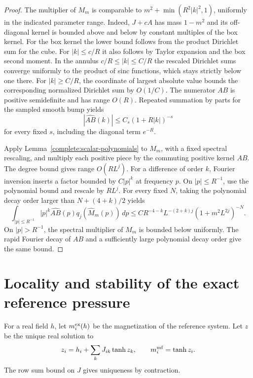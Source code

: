 \documentclass[11pt]{article}
\begin{document}
\begin{proof}
The multiplier of \(M_m\) is comparable to
\(m^2+\min(R^2|k|^2,1)\), uniformly in the indicated parameter range. Indeed, \(J+cA\) has mass \(1-m^2\) and its off-diagonal kernel is bounded above and below by constant multiples of the box kernel. For the box kernel the lower bound follows from the product Dirichlet sum for the cube. For \(|k|\le c/R\) it also follows by Taylor expansion and the box second moment. In the annulus \(c/R\le |k|\le C/R\) the rescaled Dirichlet sums converge uniformly to the product of sinc functions, which stays strictly below one there. For \(|k|\ge C/R\), the coordinate of largest absolute value bounds the corresponding normalized Dirichlet sum by \(O(1/C)\). The numerator \(AB\) is positive semidefinite and has range \(O(R)\). Repeated summation by parts for the sampled smooth bump yields
\[
 |\widehat{AB}(k)|\le C_s(1+R|k|)^{-s}
\]
for every fixed \(s\), including the diagonal term \(e^{-R}\).

Apply Lemma~\ref{complete:scalar-polynomials} to \(M_m\),
with a fixed spectral rescaling, and multiply each positive piece
by the commuting positive kernel \(AB\). The degree bound gives
range \(O(RL^j)\). For a difference of order \(k\), Fourier inversion
inserts a factor bounded by \(C|p|^k\) at frequency \(p\). On
\(|p|\le R^{-1}\), use the polynomial bound and rescale by
\(RL^j\). For every fixed \(N\), taking the polynomial decay
order larger than \(N+(4+k)/2\) yields
\[
 \int_{|p|\le R^{-1}} |p|^k\widehat{AB}(p)q_j(\widehat M_m(p))\,dp
 \le C R^{-4-k}L^{-(2+k)j}(1+m^2L^{2j})^{-N}.
\]
On \(|p|>R^{-1}\), the spectral multiplier of \(M_m\) is
bounded below uniformly. The rapid Fourier decay of \(AB\) and
a sufficiently large polynomial decay order give the same bound.
\end{proof}

\section{Locality and stability of the exact reference pressure}\label{sec:box-pressure}

For a real field \(h\), let \(m_i^{\rm ex}(h)\)
be the magnetization of the reference system. Let \(z\) be the unique real
solution to
\begin{equation}\label{eq:MF}
 z_i=h_i+\sum_k J_{ik}\tanh z_k,\qquad m_i^{\rm mf}=\tanh z_i .
\end{equation}
The row sum bound on \(J\) gives uniqueness by contraction.
\end{document}
